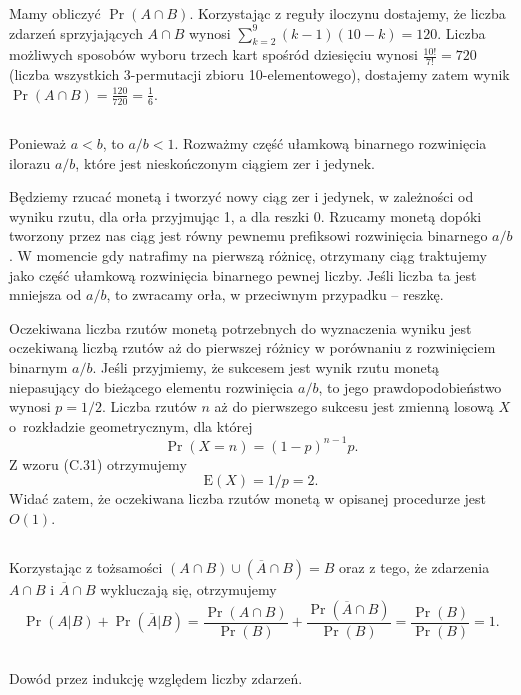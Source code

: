 Mamy obliczyć $\Pr(A\cap B)$. Korzystając z reguły iloczynu dostajemy, że liczba zdarzeń sprzyjających $A\cap B$ wynosi $\sum_{k=2}^9(k-1)(10-k)=120$. Liczba możliwych sposobów wyboru trzech kart spośród dziesięciu wynosi $\frac{10!}{7!}=720$ (liczba wszystkich 3-permutacji zbioru 10-elementowego), dostajemy zatem wynik $\Pr(A\cap B)=\frac{120}{720}=\frac{1}{6}$.

\subsection{} %
Ponieważ $a<b$, to $a/b<1$. Rozważmy część ułamkową binarnego rozwinięcia ilorazu $a/b$, które jest nieskończonym ciągiem zer i jedynek.

Będziemy rzucać monetą i tworzyć nowy ciąg zer i jedynek, w zależności od wyniku rzutu, dla orła przyjmując 1, a dla reszki 0. Rzucamy monetą dopóki tworzony przez nas ciąg jest równy pewnemu prefiksowi rozwinięcia binarnego $a/b$. W momencie gdy natrafimy na pierwszą różnicę, otrzymany ciąg traktujemy jako część ułamkową rozwinięcia binarnego pewnej liczby. Jeśli liczba ta jest mniejsza od $a/b$, to zwracamy orła, w przeciwnym przypadku -- reszkę.

Oczekiwana liczba rzutów monetą potrzebnych do wyznaczenia wyniku jest oczekiwaną liczbą rzutów aż do pierwszej różnicy w porównaniu z rozwinięciem binarnym $a/b$. Jeśli przyjmiemy, że sukcesem jest wynik rzutu monetą niepasujący do bieżącego elementu rozwinięcia $a/b$, to jego prawdopodobieństwo wynosi $p=1/2$. Liczba rzutów $n$ aż do pierwszego sukcesu jest zmienną losową $X$ o~rozkładzie geometrycznym, dla której
\[
	\Pr(X=n) = (1-p)^{n-1}p.
\]
Z wzoru (C.31) otrzymujemy
\[
	\mathrm{E}(X) = 1/p = 2.
\]
Widać zatem, że oczekiwana liczba rzutów monetą w opisanej procedurze jest $O(1)$.

\subsection{} %
Korzystając z tożsamości $(A\cap B)\cup(\overline{A}\cap B)=B$ oraz z tego, że zdarzenia $A\cap B$ i $\overline{A}\cap B$ wykluczają się, otrzymujemy
\[
	\Pr(A|B)+\Pr(\overline{A}|B) = \frac{\Pr(A\cap B)}{\Pr(B)}+\frac{\Pr(\overline{A}\cap B)}{\Pr(B)} = \frac{\Pr(B)}{\Pr(B)} = 1.
\]

\subsection{} %
Dowód przez indukcję względem liczby zdarzeń.

